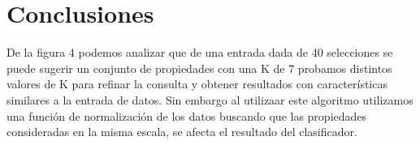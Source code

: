 \section{Conclusiones}
De la figura 4 podemos analizar que de una entrada dada de 40 selecciones se puede sugerir un conjunto de propiedades con una K de 7 probamos distintos valores de K para refinar la consulta y obtener resultados con características similares a la entrada de datos.
Sin embargo al utilizaar este algoritmo utilizamos una función de normalización de los datos buscando que las propiedades consideradas en la misma escala, se afecta el resultado del clasificador.
